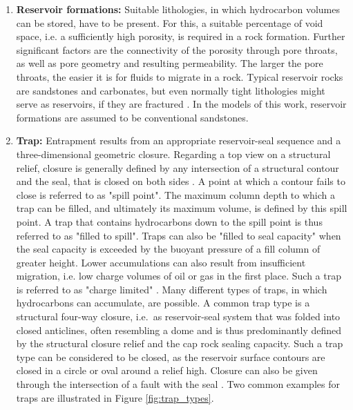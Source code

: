 \begin{enumerate}
        	\item \textbf{Reservoir formations:} Suitable lithologies, in which hydrocarbon volumes can be stored, have to be present. For this, a suitable percentage of void space, i.e. a sufficiently high porosity, is required in a rock formation. Further significant factors are the connectivity of the porosity through pore throats, as well as pore geometry and resulting permeability. The larger the pore throats, the easier it is for fluids to migrate in a rock. Typical reservoir rocks are sandstones and carbonates, but even normally tight lithologies might serve as reservoirs, if they are fractured \citep{dolson2016basics, sorkhabi2005place, north1985petroleum, selley2014elements}. In the models of this work, reservoir formations are assumed to be conventional sandstones.
        	\item \textbf{Trap:} Entrapment results from an appropriate reservoir-seal sequence and a three-dimensional geometric closure. Regarding a top view on a structural relief, closure is generally defined by any intersection of a structural contour and the seal, that is closed on both sides \citep{dolson2016basics, sorkhabi2005place, north1985petroleum}. A point at which a contour fails to close is referred to as "spill point". The maximum column depth to which a trap can be filled, and ultimately its maximum volume, is defined by this spill point. A trap that contains hydrocarbons down to the spill point is thus referred to as "filled to spill". Traps can also be "filled to seal capacity" when the seal capacity is exceeded by the buoyant pressure of a fill column of greater height. Lower accumulations can also result from insufficient migration, i.e. low charge volumes of oil or gas in the first place. Such a trap is referred to as "charge limited" \citep{dolson2016basics}. Many different types of traps, in which hydrocarbons can accumulate, are possible. A common trap type is a structural four-way closure, i.e.\ as reservoir-seal system that was folded into closed anticlines, often resembling a dome and is thus predominantly defined by the structural closure relief and the cap rock sealing capacity. Such a trap type can be considered to be closed, as the reservoir surface contours are closed in a circle or oval around a relief high. Closure can also be given through the intersection of a fault with the seal \citep{dolson2016basics, north1985petroleum}. Two common examples for traps are illustrated in Figure \ref{fig:trap_types}.
        \end{enumerate}
